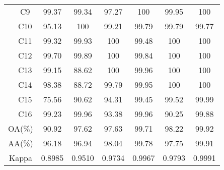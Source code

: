 \documentclass[journal]{IEEEtran}
\begin{document}
\begin{table}[hbt]
{\begin{tabular}{c|c|ccccc|c}
                                                     & C9                               & 99.37                          & 99.34     & 97.27  & 100  &  99.95 & 100   \\
                                                     & C10                              & 95.13                          & 100       & 99.21  & 99.79 & 99.79 & 99.77 \\
                                                     & C11                              & 99.32                          & 99.93     & 100    & 99.48 & 100 & 100   \\
                                                     & C12                              & 99.70                          & 99.89     & 100    & 99.84  & 100& 100   \\
                                                     & C13                              & 99.15                          & 88.62     & 100    & 99.96  & 100& 100   \\
                                                     & C14                              & 98.38                          & 88.72     & 99.79  & 99.95 & 100 & 100   \\
                                                     & C15                              & 75.56                          & 90.62     & 94.31  & 99.45 &99.52  & 99.99 \\
                                                     & C16                              & 99.23                          & 99.96     & 93.38  & 99.96 &90.25  & 99.88 \\ \hline
      \multicolumn{2}{c|}{OA(\%)}                    & 90.92                            & 97.62                          & 97.63     & 99.71& 98.22& 99.92           \\
      \multicolumn{2}{c|}{AA(\%)}                    & 96.18                            & 96.94                          & 98.04     & 99.78 & 97.75& 99.91           \\
      \multicolumn{2}{c|}{Kappa}                     & 0.8985                           & 0.9510                         & 0.9734    & 0.9967& 0.9793 & 0.9991          \\ \hline
    \end{tabular}
  }
\end{table}
\end{document}
